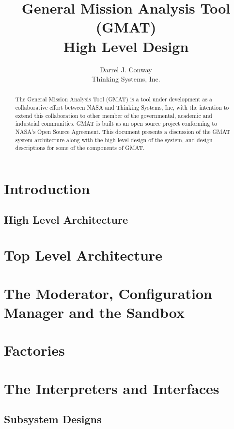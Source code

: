 \documentclass[USLetter,10pt]{report}
\title{General Mission Analysis Tool (GMAT)\\
High Level Design}
\author{Darrel J. Conway\\
 Thinking Systems, Inc.}
\begin{document}
\maketitle

\begin{abstract}
The General Mission Analysis Tool (GMAT) is a tool under development as a
collaborative effort between NASA and Thinking Systems, Inc, with the intention
to extend this collaboration to other member of the governmental, academic and
industrial communities.  GMAT is built as an open source project conforming to
NASA's Open Source Agreement.  This document presents a discussion of the GMAT
system architecture along with the high level design of the system, and design
descriptions for some of the components of GMAT.
\end{abstract}

\chapter{Introduction}

\section{High Level Architecture}

\chapter{Top Level Architecture}

\chapter{The Moderator, Configuration Manager and the Sandbox}

\chapter{Factories}

\chapter{The Interpreters and Interfaces}


\section{Subsystem Designs}
\end{document}
